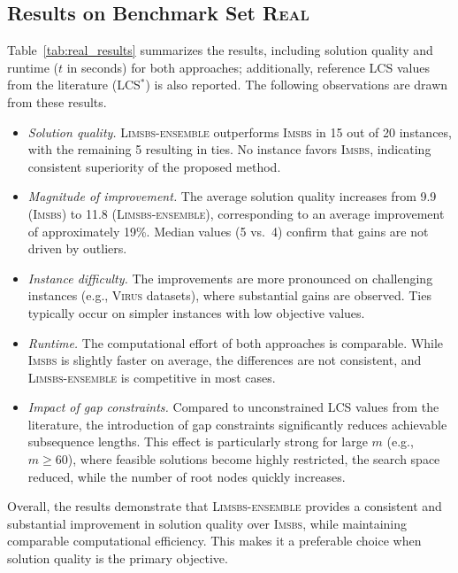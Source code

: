 \documentclass[runningheads]{llncs}
\begin{document}
\medskip
\subsection{Results on Benchmark Set \textsc{Real}}



Table~\ref{tab:real_results} summarizes the results, including solution quality and runtime ($t$ in seconds) for both approaches; additionally, reference LCS values from the literature (LCS$^*$) is also reported. The following observations are drawn from these results.

\begin{itemize}
	\item \textit{Solution quality.} \textsc{Limsbs-ensemble} outperforms \textsc{Imsbs} in 15 out of 20 instances, with the remaining 5 resulting in ties. No instance favors \textsc{Imsbs}, indicating consistent superiority of the proposed method.
	
	\item \textit{Magnitude of improvement.} The average solution quality increases from 9.9 (\textsc{Imsbs}) to 11.8 (\textsc{Limsbs-ensemble}), corresponding to an average improvement of approximately 19\%. Median values (5 vs.\ 4) confirm that gains are not driven by outliers.
	
	\item \textit{Instance difficulty.} The improvements are more pronounced on challenging instances (e.g., \textsc{Virus} datasets), where substantial gains are observed. Ties typically occur on simpler instances with low objective values.
	
	\item \textit{Runtime.} The computational effort of both approaches is comparable. While \textsc{Imsbs} is slightly faster on average, the differences are not consistent, and \textsc{Limsbs-ensemble} is competitive in most cases.
	
	\item \textit{Impact of gap constraints.} Compared to unconstrained LCS values from the literature, the introduction of gap constraints significantly reduces achievable subsequence lengths. This effect is particularly strong for large $m$ (e.g., $m \geq 60$), where feasible solutions become highly restricted, the search space reduced, while the number of root nodes quickly  increases. 
\end{itemize}

Overall, the results demonstrate that \textsc{Limsbs-ensemble} provides a consistent and substantial improvement in solution quality over \textsc{Imsbs}, while maintaining comparable computational efficiency. This makes it a preferable choice when solution quality is the primary objective.
\end{document}
